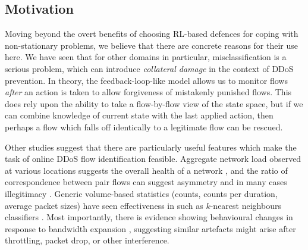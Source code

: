 \documentclass[conference, letterpaper, 10pt, times]{IEEEtran}
\begin{document}
\subsection{Motivation}
Moving beyond the overt benefits of choosing RL-based defences for coping with non-stationary problems, we believe that there are concrete reasons for their use here.
We have seen that for other domains in particular, misclassification is a serious problem, which can introduce \emph{collateral damage} in the context of DDoS prevention.
In theory, the feedback-loop-like model allows us to monitor flows \emph{after} an action is taken to allow forgiveness of mistakenly punished flows.
This does rely upon the ability to take a flow-by-flow view of the state space, but if we can combine knowledge of current state with the last applied action, then perhaps a flow which falls off identically to a legitimate flow can be rescued.

Other studies suggest that there are particularly useful features which make the task of online DDoS flow identification feasible.
Aggregate network load observed at various locations suggests the overall health of a network \cite{DBLP:journals/eaai/MalialisK15}, and the ratio of correspondence between pair flows can suggest asymmetry and in many cases illegitimacy \cite{DBLP:conf/ndss/Rossow14}.
Generic volume-based statistics (counts, counts per duration, average packet sizes) have seen effectiveness in such as $k$-nearest neighbours classifiers \cite{DBLP:conf/dsn/LeeKSPY17}.
Most importantly, there is evidence showing behavioural changes in response to bandwidth expansion \cite{DBLP:conf/ndss/KangGS16}, suggesting similar artefacts might arise after throttling, packet drop, or other interference.
\end{document}
